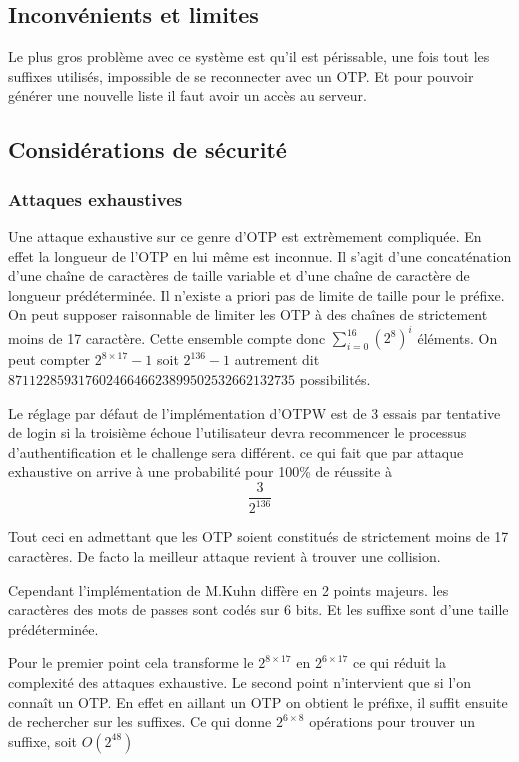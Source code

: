 \documentclass{../res/univ-projet}
\begin{document}
\subsection{Inconvénients et limites}
        Le plus gros problème avec ce système est qu'il est périssable, une fois tout les
    suffixes utilisés, impossible de se reconnecter avec un OTP. Et pour pouvoir générer
    une nouvelle liste il faut avoir un accès au serveur.

\subsection{Considérations de sécurité}
\subsubsection{Attaques exhaustives} %
        Une attaque exhaustive sur ce genre d'OTP est extrèmement compliquée.
    En effet la longueur de l'OTP en lui même est inconnue. Il s'agit d'une
    concaténation d'une chaîne de caractères de taille variable et d'une chaîne
    de caractère de longueur prédéterminée. Il n'existe a priori pas de limite
    de taille pour le préfixe. On peut supposer raisonnable de limiter les
    OTP à des chaînes de strictement moins de 17 caractère.
    Cette ensemble compte donc $\sum_{i=0}^{16}(2^8)^i$ éléments.
    On peut compter  $2^{8\times 17} - 1$ soit $2^136 -1$ autrement dit
    $87112285931760246646623899502532662132735$ possibilités.

        Le réglage par défaut de l'implémentation d'OTPW est de 3 essais par tentative de login
    si la troisième échoue l'utilisateur devra recommencer le processus d'authentification
    et le challenge sera différent. ce qui fait que par attaque exhaustive on arrive à
    une probabilité pour 100\% de réussite à
    \[\frac{3}{2^{136}}\]

        Tout ceci en admettant que les OTP soient constitués de strictement moins
    de 17 caractères. De facto la meilleur attaque revient à trouver une collision.
    
        Cependant l'implémentation de M.Kuhn diffère en 2 points majeurs. les caractères des mots
    de passes sont codés sur 6 bits. Et les suffixe sont d'une taille prédéterminée.
    
        Pour le premier point cela transforme le $2^{8\times 17}$ en $2^{6\times 17}$ ce qui réduit
    la complexité des attaques exhaustive. Le second point n'intervient que si l'on connaît un OTP.
    En effet en aillant un OTP on obtient le préfixe, il suffit ensuite de rechercher sur les suffixes.
    Ce qui donne $2^{6\times 8}$ opérations pour trouver un suffixe, soit $O(2^48)$
    
\end{document}
